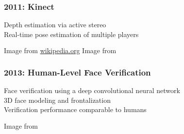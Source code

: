 \documentclass[xetex,professionalfont]{beamer}
\begin{document}

\begin{frame}
\frametitle{2011: Kinect}

Depth estimation via active stereo\\\medskip
Real-time pose estimation of multiple players

\bigskip
\begin{center}
	{\centering Image from \url{wikipedia.org}}
	\qquad
	{\centering Image from \cite{shotton2011}}
\end{center}

\end{frame}


\begin{frame}
\frametitle{2013: Human-Level Face Verification}

Face verification using a deep convolutional neural network\\\medskip %
3D face modeling and frontalization\\\medskip
Verification performance comparable to humans %

\bigskip
\begin{center}
	{\centering Image from \cite{taigman2013}}
\end{center}

\end{frame}
\end{document}
